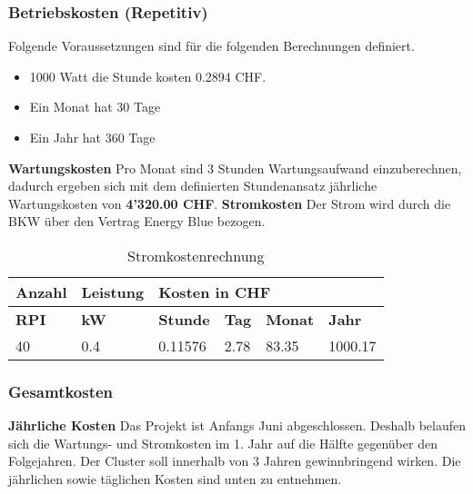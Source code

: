 \subsubsection{Betriebskosten (Repetitiv)}

Folgende Voraussetzungen sind für die folgenden Berechnungen definiert.
\begin{itemize}
	\item 1000 Watt die Stunde kosten 0.2894 CHF.
	\item Ein Monat hat 30 Tage
	\item Ein Jahr hat 360 Tage
\end{itemize}

\textbf{Wartungskosten}
\newline
Pro Monat sind 3 Stunden Wartungsaufwand einzuberechnen, dadurch ergeben sich mit dem definierten Stundenansatz jährliche Wartungskosten von \textbf{4'320.00 CHF}. \newline
\newline
\textbf{Stromkosten}
Der Strom wird durch die BKW über den Vertrag Energy Blue bezogen.

\begin{table}[H]
\centering
\begin{tabular}{p{1.5cm}p{2cm}|p{2.75cm}p{2.75cm}p{2.75cm}p{2.75cm}}
\hline
\rowcolor{heading} \textbf{Anzahl} & \textbf{Leistung} & \multicolumn{4}{l}{\textbf{Kosten in CHF}} \\\hline
\rowcolor{subheading} \textbf{RPI} & \textbf{kW} & \textbf{Stunde} &\textbf{Tag} & \textbf{Monat} &\textbf{Jahr} \\\hline
40 & 0.4 & 0.11576 & 2.78 & 83.35 & 1000.17 \\\hline
\end{tabular}
\caption{Stromkostenrechnung}
\end{table}

\subsubsection{Gesamtkosten}

\textbf{Jährliche Kosten} \newline
Das Projekt ist Anfangs Juni abgeschlossen. Deshalb belaufen sich die Wartungs- und Stromkosten im 1. Jahr auf die Hälfte gegenüber den Folgejahren.
Der Cluster soll innerhalb von 3 Jahren gewinnbringend wirken. Die jährlichen sowie täglichen Kosten sind unten zu entnehmen. 

